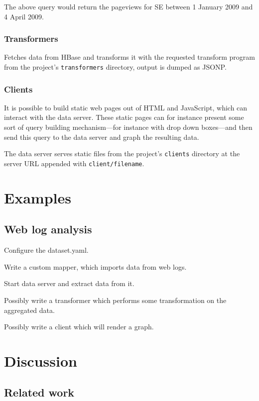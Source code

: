 \documentclass[a4paper,10pt]{book}
\begin{document}
The above query would return the pageviews for SE between 1 January 2009
and 4 April 2009.


\subsection{Transformers}

Fetches data from HBase and transforms it with the requested transform
program from the project's \texttt{transformers} directory, output is
dumped as JSONP.


\subsection{Clients}

It is possible to build static web pages out of HTML and JavaScript, which
can interact with the data server. These static pages can for instance
present some sort of query building mechanism---for instance with drop down
boxes---and then send this query to the data server and graph the resulting
data.

The data server serves static files from the project's \texttt{clients}
directory at the server URL appended with \texttt{client/filename}.



\chapter{Examples}

\section{Web log analysis}

Configure the dataset.yaml.

Write a custom mapper, which imports data from web logs.

Start data server and extract data from it.

Possibly write a transformer which performs some transformation on the
aggregated data.

Possibly write a client which will render a graph.



\chapter{Discussion}

\section{Related work}
\end{document}
